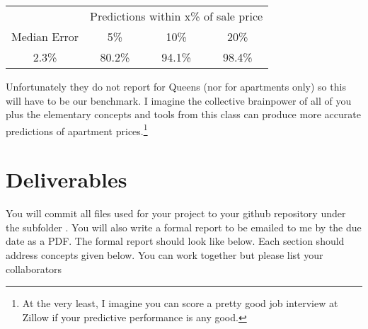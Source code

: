 \documentclass[12pt]{article}
\begin{document}
\begin{table}[htp]
\centering\small
\begin{tabular}{cccc}
& \multicolumn{3}{c}{Predictions within x\% of sale price} \\
Median Error 	 & 5\%  	&  10\%	&  20\%  \\
\hline
2.3\% &	80.2\%	& 94.1\%	& 98.4\%
\end{tabular}
\end{table}

\noindent Unfortunately they do not report for Queens (nor for apartments only) so this will have to be our benchmark.  I imagine the collective brainpower of all of you plus the elementary concepts and tools from this class can produce more accurate predictions of apartment prices.\footnote{At the very least, I imagine you can score a pretty good job interview at Zillow if your predictive performance is any good.}

%

\section*{Deliverables}

You will commit all files used for your project to your github repository under the subfolder . You will also write a formal report to be emailed to me by the due date as a PDF. The formal report should look like below. Each section should address concepts given below. You can work together but please list your collaborators  
\end{document}

